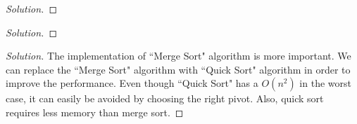\documentclass[12pt]{article}
\newenvironment{problem}[2][Problem]{\begin{trivlist}
\item[\hskip \labelsep {\bfseries #1}\hskip \labelsep {\bfseries #2.}]}{\end{trivlist}}
\newenvironment{solution}{\renewcommand\qedsymbol{$\blacksquare$}\begin{proof}[Solution]}{\end{proof}}
\begin{document}
\begin{solution}
\end{solution}

\begin{problem}{3}
\end{problem}

\begin{problem}{4}
\end{problem}

\begin{solution}
\end{solution}

\begin{problem}{5}
\end{problem}

\begin{solution}
The implementation of ``Merge Sort" algorithm is more important. We can replace the ``Merge Sort" algorithm with ``Quick Sort" algorithm in order to improve the performance. Even though ``Quick Sort" has a $O(n^2)$ in the worst case, it can easily be avoided by choosing the right pivot. Also, quick sort requires less memory than merge sort. 
\end{solution}

\end{document}
